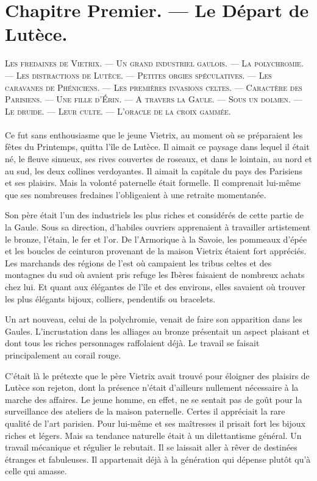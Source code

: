 \documentclass[a4paper, 11pt, oneside, polutonikogreek, french]{article}
\begin{document}
\section{Chapitre Premier. --- Le Départ de Lutèce.}
\begin{center}
\scshape
\small
Les fredaines de Vietrix. --- Un grand industriel gaulois. --- La polychromie. --- Les distractions de Lutèce. --- Petites orgies spéculatives. --- Les caravanes de Phéniciens. --- Les premières invasions celtes. --- Caractère des Parisiens. --- Une fille d'Érin. --- A travers la Gaule. --- Sous un dolmen. --- Le druide. --- Leur culte. --- L'oracle de la croix gammée.
\end{center}
\paragraph{}
Ce fut sans enthousiasme que le jeune Vietrix, au moment où se préparaient les fêtes du Printemps, quitta l'île de Lutèce. Il aimait ce paysage dans lequel il était né, le fleuve sinueux, ses rives couvertes de roseaux, et dans le lointain, au nord et au sud, les deux collines verdoyantes. Il aimait la capitale du pays des Parisiens et ses plaisirs. Mais la volonté paternelle était formelle. Il comprenait lui-même que ses nombreuses fredaines l'obligeaient à une retraite momentanée.

Son père était l'un des industriels les plus riches et considérés de cette partie de la Gaule. Sous sa direction, d'habiles ouvriers apprenaient à travailler artistement le bronze, l'étain, le fer et l'or. De l'Armorique à la Savoie, les pommeaux d'épée et les boucles de ceinturon provenant de la maison Vietrix étaient fort appréciés. Les marchands des régions de l'est où campaient les tribus celtes et des montagnes du sud où avaient pris refuge les Ibères faisaient de nombreux achats chez lui. Et quant aux élégantes de l'île et des environs, elles savaient où trouver les plus élégants bijoux, colliers, pendentifs ou bracelets.

Un art nouveau, celui de la polychromie, venait de faire son apparition dans les Gaules. L'incrustation dans les alliages au bronze présentait un aspect plaisant et dont tous les riches personnages raffolaient déjà. Le travail se faisait principalement au corail rouge.

C'était là le prétexte que le père Vietrix avait trouvé pour éloigner des plaisirs de Lutèce son rejeton, dont la présence n'était d'ailleurs nullement nécessaire à la marche des affaires. Le jeune homme, en effet, ne se sentait pas de goût pour la surveillance des ateliers de la maison paternelle. Certes il appréciait la rare qualité de l'art parisien. Pour lui-même et ses maîtresses il prisait fort les bijoux riches et légers. Mais sa tendance naturelle était à un dilettantisme général. Un travail mécanique et régulier le rebutait. Il se laissait aller à rêver de destinées étranges et fabuleuses. Il appartenait déjà à la génération qui dépense plutôt qu'à celle qui amasse.
\end{document}

